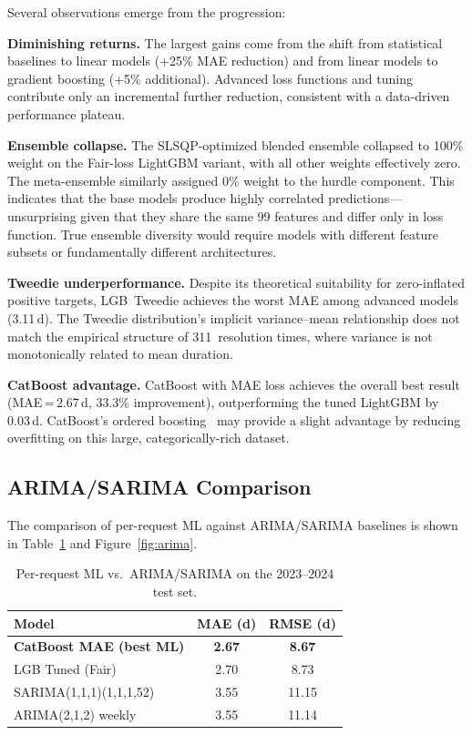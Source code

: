 \documentclass[sigconf,nonacm]{acmart}
\begin{document}
Several observations emerge from the progression:

\textbf{Diminishing returns.} The largest gains come from the
shift from statistical baselines to linear models (+25\% MAE
reduction) and from linear models to gradient boosting (+5\%
additional). Advanced loss functions and tuning contribute only
an incremental further reduction, consistent with a
data-driven performance plateau.

\textbf{Ensemble collapse.} The SLSQP-optimized blended ensemble
collapsed to 100\% weight on the Fair-loss LightGBM variant,
with all other weights effectively zero. The meta-ensemble
similarly assigned 0\% weight to the hurdle component. This
indicates that the base models produce highly correlated
predictions---unsurprising given that they share the same 99
features and differ only in loss function. True ensemble diversity
would require models with different feature subsets or
fundamentally different architectures.

\textbf{Tweedie underperformance.} Despite its theoretical
suitability for zero-inflated positive targets, LGB~Tweedie
achieves the worst MAE among advanced models (3.11\,d). The
Tweedie distribution's implicit variance--mean relationship does
not match the empirical structure of 311~resolution times, where
variance is not monotonically related to mean duration.

\textbf{CatBoost advantage.} CatBoost with MAE loss achieves the
overall best result (MAE\,=\,2.67\,d, 33.3\% improvement),
outperforming the tuned LightGBM by 0.03\,d. CatBoost's
ordered boosting~\cite{prokhorenkova2018catboost} may provide a
slight advantage by reducing overfitting on this large,
categorically-rich dataset.

\subsection{ARIMA/SARIMA Comparison}
\label{sec:arima}

The comparison of per-request ML against ARIMA/SARIMA baselines
is shown in Table~\ref{tab:arima} and Figure~\ref{fig:arima}.

\begin{table}[t]
\caption{Per-request ML vs.\ ARIMA/SARIMA on the 2023--2024 test
set.}
\label{tab:arima}
\centering
\small
\begin{tabular}{lcc}
\toprule
\textbf{Model} & \textbf{MAE (d)} & \textbf{RMSE (d)} \\
\midrule
\textbf{CatBoost MAE (best ML)} & \textbf{2.67} &
  \textbf{8.67} \\
LGB Tuned (Fair)                & 2.70 &  8.73 \\
SARIMA(1,1,1)(1,1,1,52)        & 3.55 & 11.15 \\
ARIMA(2,1,2) weekly            & 3.55 & 11.14 \\
\bottomrule
\end{tabular}
\end{table}
\end{document}
